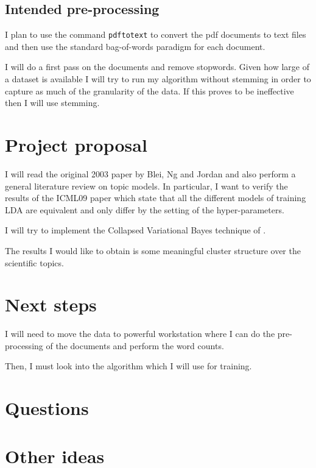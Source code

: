 \documentclass[11pt]{article}
\begin{document}
	
	\subsection{Intended pre-processing}
	
		I plan to use the command \texttt{pdftotext} to convert the pdf documents to text files and
		then use the standard bag-of-words paradigm for each document.
		
		I will do a first pass on the documents and remove stopwords.		
		Given how large of a dataset is available I will try to run my algorithm without stemming in order
		to capture as much of the granularity of the data.
		If this proves to be ineffective then I will use stemming.
		  

	
\section{Project proposal}

	I will read the original 2003 paper by Blei, Ng and Jordan \cite{Blei2003} and also perform a general literature
	review on topic models.
	In particular, I want to verify the results of the ICML09 paper \cite{Teh2009} which state that all the different 
	models of training
	LDA are equivalent and only differ by the setting of the hyper-parameters.
	
	I will try to implement the Collapsed Variational Bayes technique of \cite{Teh2007}.
	
	The results I would like to obtain is some meaningful cluster structure over the scientific topics.
	
	
\section{Next steps}
	
	I will need to move the data to powerful workstation where I can do the pre-processing of the
	documents and perform the word counts.
	
	Then, I must look into the algorithm which I will use for training.
	

	
\section{Questions}

	
	
	
\section{Other ideas}
\end{document}
